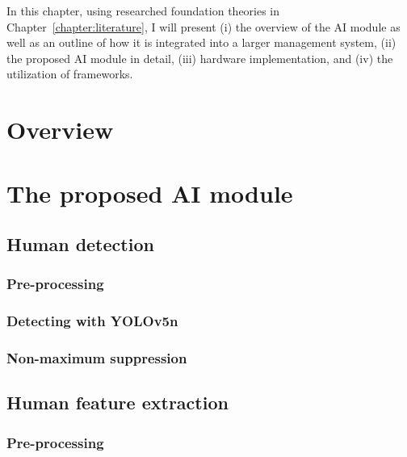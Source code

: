 \documentclass[../main.tex]{subfiles}
\begin{document}
In this chapter, using researched foundation theories in Chapter~\ref{chapter:literature}, I will present (i) the overview of the AI module as well as an outline of how it is integrated into a larger management system, (ii) the proposed AI module in detail, (iii) hardware implementation, and (iv) the utilization of frameworks.
\section{Overview}
\label{sec:overview}


\section{The proposed AI module}
\label{sec:flow}

\subsection{Human detection}
\label{subsec:hudect}


\subsubsection{Pre-processing}


\subsubsection{Detecting with YOLOv5n}


\subsubsection{Non-maximum suppression}


\subsection{Human feature extraction}

\subsubsection{Pre-processing}
\end{document}
